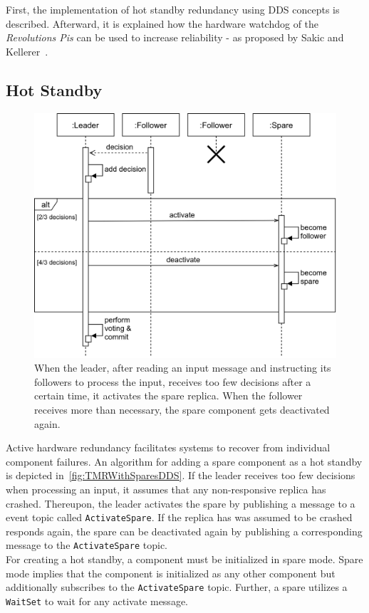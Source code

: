 First, the implementation of hot standby redundancy using DDS concepts is described.
Afterward, it is explained how the hardware watchdog of the \textit{Revolutions Pis} can be used to increase reliability - as proposed by Sakic and Kellerer~\cite{SakicTimeInConsensus}.

\subsection{Hot Standby}
\label{sec:HotStandby}

\begin{figure}[!ht]
	\centering
	\includegraphics[width=0.75\linewidth]{images/sequence/ActivateSpare}
	\caption{When the leader, after reading an input message and instructing its followers to process the input, receives too few decisions after a certain time, it activates the spare replica. When the follower receives more than necessary, the spare component gets deactivated again.}
	\label{fig:SeqActivateSpare}
\end{figure}

Active hardware redundancy facilitates systems to recover from individual component failures.
An algorithm for adding a spare component as a hot standby is depicted in~\autoref{fig:TMRWithSparesDDS}.
If the leader receives too few decisions when processing an input, it assumes that any non-responsive replica has crashed.
Thereupon, the leader activates the spare by publishing a message to a  event topic called \texttt{ActivateSpare}.
If the replica has was assumed to be crashed responds again, the spare can be deactivated again by publishing a corresponding message to the \texttt{ActivateSpare} topic.
\\

For creating a hot standby, a component must be initialized in spare mode.
Spare mode implies that the component is initialized as any other component but additionally subscribes to the \texttt{ActivateSpare} topic.
Further, a spare utilizes a \texttt{WaitSet} to wait for any activate message.
\\

